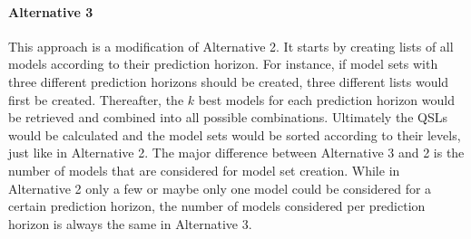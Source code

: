 \paragraph{Alternative 3}
This approach is a modification of Alternative 2. It starts by creating lists of all models according to their prediction horizon. For instance, if model sets with three different prediction horizons should be created, three different lists would first be created. Thereafter, the $k$ best models for each prediction horizon would be retrieved and combined into all possible combinations. Ultimately the QSLs would be calculated and the model sets would be sorted according to their levels, just like in Alternative 2. The major difference between Alternative 3 and 2 is the number of models that are considered for model set creation. While in Alternative 2 only a few or maybe only one model could be considered for a certain prediction horizon, the number of models considered per prediction horizon is always the same in Alternative 3. 

